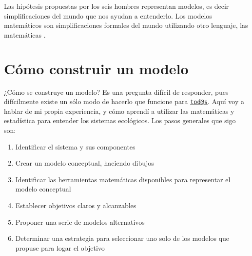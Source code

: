 \documentclass[
]{book}
\providecommand{\tightlist}{%
  \setlength{\itemsep}{0pt}\setlength{\parskip}{0pt}}
\begin{document}
Las hipótesis propuestas por los seis hombres representan modelos, es decir simplificaciones del mundo que nos ayudan a entenderlo. Los modelos matemáticos son simplificaciones formales del mundo utilizando otro lenguaje, las matemáticas \citep{haefner1998modeling}.

\hypertarget{cuxf3mo-construir-un-modelo}{%
\section{Cómo construir un modelo}\label{cuxf3mo-construir-un-modelo}}

¿Cómo se construye un modelo? Es una pregunta difícil de responder, pues difícilmente existe un sólo modo de hacerlo que funcione para \href{mailto:tod@s}{\nolinkurl{tod@s}}. Aquí voy a hablar de mi propia experiencia, y cómo aprendí a utilizar las matemáticas y estadística para entender los sistemas ecológicos. Los pasos generales que sigo son:

\begin{enumerate}
\def\labelenumi{\arabic{enumi}.}
\tightlist
\item
  Identificar el sistema y sus componentes
\item
  Crear un modelo conceptual, haciendo dibujos
\item
  Identificar las herramientas matemáticas disponibles para representar el modelo conceptual
\item
  Establecer objetivos claros y alcanzables
\item
  Proponer una serie de modelos alternativos
\item
  Determinar una estrategia para seleccionar uno solo de los modelos que propuse para logar el objetivo
\end{enumerate}
\end{document}
